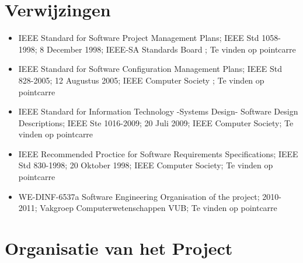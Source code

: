 \documentclass{article}
\begin{document}
\newpage

\section{Verwijzingen}



\begin{itemize}
	\item IEEE Standard for Software Project Management Plans; IEEE Std 1058-1998; 8 December 1998; IEEE-SA Standards Board ; Te vinden op pointcarre \\ 
	\item IEEE Standard for Software Configuration Management Plans; IEEE Std 828-2005; 12 Augustus 2005; IEEE Computer Society ; Te vinden op pointcarre \\
	\item IEEE Standard for Information Technology -Systems Design- Software Design Descriptions; IEEE Ste 1016-2009; 20 Juli 2009; IEEE Computer Society; Te vinden op pointcarre \\
	\item IEEE Recommended Proctice for Software Requirements Specifications; IEEE Std 830-1998; 20 Oktober 1998; IEEE Computer Society; Te vinden op pointcarre \\
	\item WE-DINF-6537a  Software Engineering Organisation of the project; 2010-2011; Vakgroep Computerwetenschappen VUB; Te vinden op pointcarre \\
\end{itemize}


\newpage
\section{Organisatie van het Project}

\end{document}
